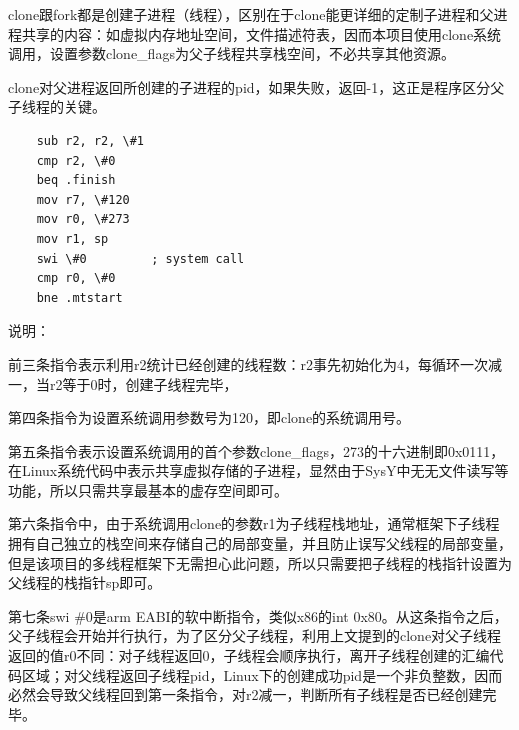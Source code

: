 clone跟fork都是创建子进程（线程），区别在于clone能更详细的定制子进程和父进程共享的内容：如虚拟内存地址空间，文件描述符表，因而本项目使用clone系统调用，设置参数clone\_flags为父子线程共享栈空间，不必共享其他资源。

clone对父进程返回所创建的子进程的pid，如果失败，返回-1，这正是程序区分父子线程的关键。

\begin{verbatim}
    sub r2, r2, \#1     
    cmp r2, \#0         
    beq .finish			
    mov r7, \#120	    
    mov r0, \#273	    
    mov r1, sp	        
    swi \#0         ; system call
    cmp r0, \#0		    
    bne .mtstart
\end{verbatim}

说明：

前三条指令表示利用r2统计已经创建的线程数：r2事先初始化为4，每循环一次减一，当r2等于0时，创建子线程完毕，

第四条指令为设置系统调用参数号为120，即clone的系统调用号。

第五条指令表示设置系统调用的首个参数clone\_flags，273的十六进制即0x0111，在Linux系统代码中表示共享虚拟存储的子进程，显然由于SysY中无无文件读写等功能，所以只需共享最基本的虚存空间即可。
    
第六条指令中，由于系统调用clone的参数r1为子线程栈地址，通常框架下子线程拥有自己独立的栈空间来存储自己的局部变量，并且防止误写父线程的局部变量，但是该项目的多线程框架下无需担心此问题，所以只需要把子线程的栈指针设置为父线程的栈指针sp即可。

第七条swi \#0是arm EABI的软中断指令，类似x86的int 0x80。从这条指令之后，父子线程会开始并行执行，为了区分父子线程，利用上文提到的clone对父子线程返回的值r0不同：对子线程返回0，子线程会顺序执行，离开子线程创建的汇编代码区域；对父线程返回子线程pid，Linux下的创建成功pid是一个非负整数，因而必然会导致父线程回到第一条指令，对r2减一，判断所有子线程是否已经创建完毕。